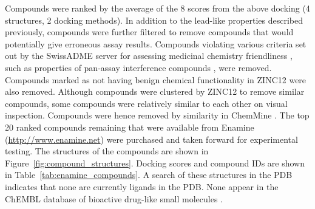 Compounds were ranked by the average of the 8 scores from the above docking (4 structures, 2 docking methods).
In addition to the lead-like properties described previously, compounds were further filtered to remove compounds that would potentially give erroneous assay results.
Compounds violating various criteria set out by the SwissADME server for assessing medicinal chemistry friendliness \cite{Daina2017}, such as properties of pan-assay interference compounds \cite{Baell2014}, were removed.
Compounds marked as not having benign chemical functionality in ZINC12 were also removed.
Although compounds were clustered by ZINC12 to remove similar compounds, some compounds were relatively similar to each other on visual inspection.
Compounds were hence removed by similarity in ChemMine \cite{Backman2011}.
The top 20 ranked compounds remaining that were available from Enamine (\url{http://www.enamine.net}) were purchased and taken forward for experimental testing.
The structures of the compounds are shown in Figure~\ref{fig:compound_structures}.
Docking scores and compound IDs are shown in Table~\ref{tab:enamine_compounds}.
A search of these structures in the PDB indicates that none are currently ligands in the PDB.
None appear in the ChEMBL database of bioactive drug-like small molecules \cite{Gaulton2017}.


